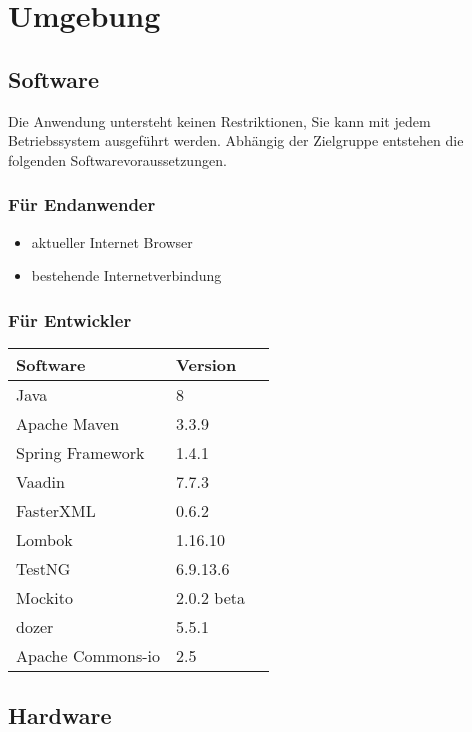  
\section{Umgebung}
 
\subsection{Software}

Die Anwendung untersteht keinen Restriktionen, Sie kann mit jedem Betriebssystem ausgeführt werden.
Abhängig der Zielgruppe entstehen die folgenden Softwarevoraussetzungen.

\subsubsection {Für Endanwender}

\begin{itemize}
\item aktueller Internet Browser 
\item bestehende Internetverbindung
\end{itemize}

\subsubsection	{Für Entwickler}


\begin{table}[h]
\renewcommand{\arraystretch}{1.5}
\begin{tabular}{llr}
\textbf{Software} & \textbf{Version} \\ \hline
Java              & 8                \\
Apache Maven      & 3.3.9            \\
Spring Framework  & 1.4.1            \\ 
Vaadin            & 7.7.3            \\
FasterXML         & 0.6.2            \\
Lombok            & 1.16.10          \\
TestNG            & 6.9.13.6         \\
Mockito           & 2.0.2 beta       \\
dozer             & 5.5.1            \\
Apache Commons-io & 2.5             
\end{tabular}
\end{table}
 
\subsection{Hardware}

